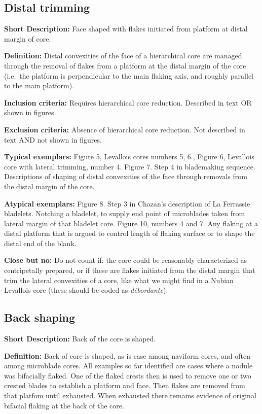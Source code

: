 \documentclass[
]{article}
\begin{document}
\subsection{Distal trimming}\label{distal-trimming}

\textbf{Short Description:} Face shaped with flakes initiated from
platform at distal margin of core.

\textbf{Definition:} Distal convexities of the face of a hierarchical
core are managed through the removal of flakes from a platform at the
distal margin of the core (i.e.~the platform is perpendicular to the
main flaking axis, and roughly parallel to the main platform).

\textbf{Inclusion criteria:} Requires hierarchical core reduction.
Described in text OR shown in figures.

\textbf{Exclusion criteria:} Absence of hierarchical core reduction. Not
described in text AND not shown in figures.

\textbf{Typical exemplars:} Figure 5, Levallois cores numbers 5, 6.,
Figure 6, Levallois core with lateral trimming, number 4. Figure 7. Step
4 in blademaking sequence. Descriptions of shaping of distal convexities
of the face through removals from the distal margin of the core.

\textbf{Atypical exemplars:} Figure 8. Step 3 in Chazan's description of
La Ferrassie bladelets. Notching a bladelet, to supply end point of
microblades taken from lateral margin of that bladelet core. Figure 10,
numbers 4 and 7. Any flaking at a distal platform that is argued to
control length of flaking surface or to shape the distal end of the
blank.

\textbf{Close but no:} Do not count if: the core could be reasonably
characterized as centripetally prepared, or if these are flakes
initiated from the distal margin that trim the lateral convexities of a
core, like what we might find in a Nubian Levallois core (these should
be coded as \emph{débordante}).

\subsection{Back shaping}\label{back-shaping}

\textbf{Short Description:} Back of the core is shaped.

\textbf{Definition:} Back of core is shaped, as is case among naviform
cores, and often among microblade cores. All examples so far identified
are cases where a nodule was bifacially flaked. One of the flaked crests
then is used to remove one or two crested blades to establish a platform
and face. Then flakes are removed from that platfom until exhausted.
When exhausted there remains evidence of original bifacial flaking at
the back of the core.
\end{document}
